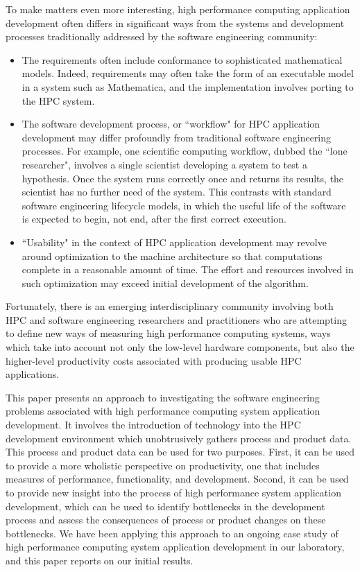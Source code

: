 \documentclass[10pt,twocolumn]{article}
\begin{document}
To make matters even more interesting, high performance computing
application development often differs in significant ways from the systems
and development processes traditionally addressed by the software
engineering community:

\begin{itemize}

\item The requirements often include conformance to sophisticated
mathematical models. Indeed, requirements may often take the form of an
executable model in a system such as Mathematica, and the implementation
involves porting to the HPC system.
       
\item The software development process, or ``workflow" for HPC application
development may differ profoundly from traditional software engineering
processes. For example, one scientific computing workflow, dubbed the
``lone researcher", involves a single scientist developing a system to test
a hypothesis. Once the system runs correctly once and returns its results,
the scientist has no further need of the system. This contrasts with
standard software engineering lifecycle models, in which the useful life of
the software is expected to begin, not end, after the first correct
execution.
       
\item ``Usability" in the context of HPC application development may
revolve around optimization to the machine architecture so that
computations complete in a reasonable amount of time. The effort and
resources involved in such optimization may exceed initial development of
the algorithm.

\end{itemize}

Fortunately, there is an emerging interdisciplinary community involving
both HPC and software engineering researchers and practitioners who are
attempting to define new ways of measuring high performance computing
systems, ways which take into account not only the low-level hardware
components, but also the higher-level productivity costs associated with
producing usable HPC applications.

This paper presents an approach to investigating the software engineering
problems associated with high performance computing system application
development.  It involves the introduction of technology into the HPC
development environment which unobtrusively gathers process and product
data.  This process and product data can be used for two purposes. First,
it can be used to provide a more wholistic perspective on productivity, one
that includes measures of performance, functionality, and development.
Second, it can be used to provide new insight into the process of high
performance system application development, which can be used to identify
bottlenecks in the development process and assess the consequences of
process or product changes on these bottlenecks.  We have been applying
this approach to an ongoing case study of high performance computing system
application development in our laboratory, and this paper reports on our
initial results.
\end{document}
